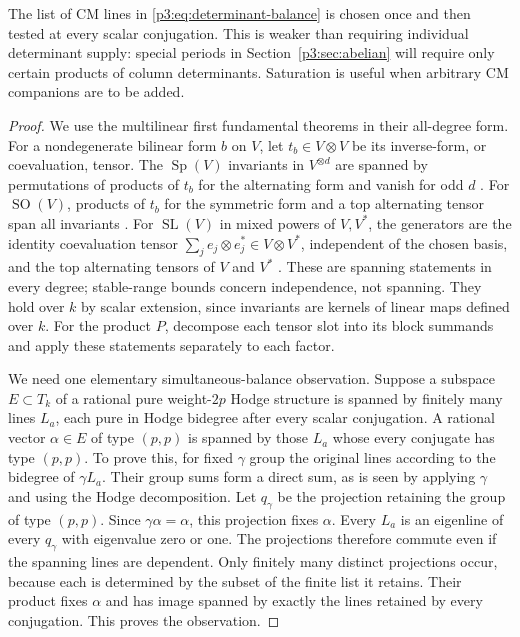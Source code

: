 \documentclass[11pt]{article}
\numberwithin{equation}{section}
\begin{document}
The list of CM lines in \eqref{p3:eq:determinant-balance} is chosen
once and then tested at every scalar conjugation.  This is weaker
than requiring individual determinant supply: special periods in
Section~\ref{p3:sec:abelian} will require only certain products of
column determinants.  Saturation is useful when arbitrary CM
companions are to be added.

\begin{proof}
We use the multilinear first fundamental theorems in their all-degree
form.  For a nondegenerate bilinear form $b$ on $V$, let
$t_b\in V\otimes V$ be its inverse-form, or coevaluation, tensor.
The $\operatorname{Sp}(V)$ invariants in $V^{\otimes d}$
are spanned by permutations of products of $t_b$ for the
alternating form and vanish for odd $d$
\cite[Theorem~4.1 and Corollary~4.2]{LehrerZhang2015}.
For $\operatorname{SO}(V)$, products of $t_b$ for the symmetric
form and a top alternating tensor span all invariants
\cite[Theorem~2.1 and Corollary~4.2]{LehrerZhang2017}.
For $\operatorname{SL}(V)$ in mixed powers of $V,V^*$, the
generators are the identity coevaluation tensor
$\sum_j e_j\otimes e_j^*\in V\otimes V^*$, independent of
the chosen basis, and the top alternating tensors
of $V$ and $V^*$ \cite[Section~5]{Schrijver2008}.
These are spanning statements in every degree; stable-range bounds
concern independence, not spanning.  They hold over $k$ by scalar
extension, since invariants are kernels of linear maps defined over
$k$.  For the product $P$, decompose each tensor slot into its
block summands and apply these statements separately to each factor.

We need one elementary simultaneous-balance observation.  Suppose a
subspace $E\subset T_k$ of a rational pure weight-$2p$ Hodge
structure is spanned by finitely many lines $L_a$, each pure in
Hodge bidegree after every scalar conjugation.  A rational vector
$\alpha\in E$ of type $(p,p)$ is spanned by those $L_a$ whose
every conjugate has type $(p,p)$.  To prove this, for fixed
$\gamma$ group the original lines according to the bidegree of
$\gamma L_a$.  Their group sums form a direct sum, as is seen by
applying $\gamma$ and using the Hodge decomposition.  Let
$q_\gamma$ be the projection retaining the group of type $(p,p)$.
Since $\gamma\alpha=\alpha$, this projection fixes $\alpha$.
Every $L_a$ is an eigenline of every $q_\gamma$ with eigenvalue
zero or one.  The projections therefore commute even if the spanning
lines are dependent.  Only finitely many distinct projections occur,
because each is determined by the subset of the finite list it retains.
Their product fixes $\alpha$ and has image spanned by exactly the
lines retained by every conjugation.  This proves the observation.


\end{proof}
\end{document}
